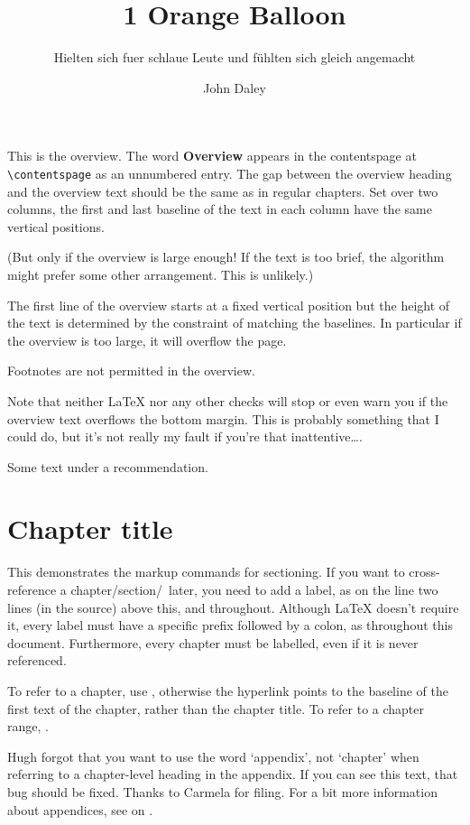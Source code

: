 \documentclass{grattan}
\author{John Daley}
\title{1 Orange Balloon}
\subtitle{Hielten sich fuer schlaue Leute und fühlten sich gleich angemacht}
\begin{document}
\begin{overview}
This is the overview. 
The word \textbf{Overview} appears in the contentspage at \verb=\contentspage= as an unnumbered entry.
The gap between the overview heading and the overview text should be the same as in regular chapters. 
Set over two columns, the first and last baseline of the text in each column have the same vertical positions.

(But only if the overview is large enough!
If the text is too brief, the algorithm might prefer some other arrangement.
This is unlikely.) 

The first line of the overview starts at a fixed vertical position but the height of the text is determined by the constraint of matching the baselines.
In particular if the overview is too large, it will overflow the page.

Footnotes are not permitted in the overview.

Note that neither \LaTeX{} nor any other checks will stop or even warn you if the overview text overflows the bottom margin.
This is probably something that I could do, but it's not really my fault if you're that inattentive\dots . 
\end{overview}

\begin{recommendations}
\label{rec:use-labels}
Some text under a recommendation.
\end{recommendations}

\contentspage

\chapter{Chapter title}\label{chap:example}
This demonstrates the markup commands for sectioning. 
If you want to cross-reference a chapter/section/\etc\ later, you need to add a label, as on the line two lines (in the source) above this, and throughout.
Although \LaTeX{} doesn't require it, every label must have a specific prefix followed by a colon, as throughout this document.
Furthermore, every chapter must be labelled, even if it is never referenced.

To refer to a chapter, use , %
otherwise the hyperlink points to the baseline of the first text of the chapter, rather than the chapter title.
To refer to a chapter range, .

Hugh forgot that you want to use the word `appendix', not `chapter' when referring to a chapter-level heading in the appendix.
If you can see this text, that bug should be fixed.
Thanks to Carmela for filing. 
For a bit more information about appendices, see  on . 
\end{document}
